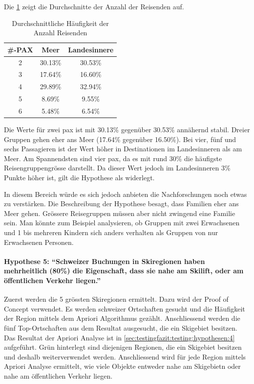 Die \cref{sec:testingfazit:testing:hypothesen:3:2} zeigt die Durchschnitte der Anzahl der Reisenden auf.
\begin{table}[H] 
	\caption{Durchschnittliche Häufigkeit der Anzahl Reisenden}
	\centering
	\label{sec:testingfazit:testing:hypothesen:3:2}
	\begin{tabular}{ | c | c | c | } 
		\hline 
		\rowcolor{tableheadcolor}
		\bfseries \#-PAX & \bfseries Meer & \bfseries Landesinnere \\ \hline 		
		2 & 30.13\% & 30.53\% \\ \hline
		3 & 17.64\% & 16.60\% \\ \hline
		4 & 29.89\% & 32.94\% \\ \hline
		5 & 8.69\% & 9.55\% \\ \hline
		6 & 5.48\% & 6.54\% \\ \hline
	\end{tabular}
\end{table}

Die Werte für zwei \gls{pax} ist mit 30.13\% gegenüber 30.53\% annähernd stabil. Dreier Gruppen gehen eher ans Meer (17.64\% gegenüber 16.50\%). Bei vier, fünf und sechs Passagieren ist der Wert höher in Destinationen im Landesinneren als am Meer. Am Spannendsten sind vier \gls{pax}, da es mit rund 30\% die häufigste Reisengruppengrösse darstellt. Da dieser Wert jedoch im Landesinneren 3\% Punkte höher ist, gilt die Hypothese als widerlegt.

In diesem Bereich würde es sich jedoch anbieten die Nachforschungen noch etwas zu verstärken. Die Beschreibung der Hypothese besagt, dass Familien eher ans Meer gehen. Grössere Reisegruppen müssen aber nicht zwingend eine Familie sein. Man könnte zum Beispiel analysieren, ob Gruppen mit zwei Erwachsenen und 1 bis mehreren Kindern sich anders verhalten als Gruppen von nur Erwachsenen Personen.

\paragraph{Hypothese 5: "`Schweizer Buchungen in Skiregionen haben mehrheitlich (80\%) die Eigenschaft, dass sie nahe am Skilift, oder am öffentlichen Verkehr liegen."'} Zuerst werden die 5 grössten Skiregionen ermittelt. Dazu wird der Proof of Concept verwendet. Es werden schweizer Ortschaften gesucht und die Häufigkeit der Region mittels dem Apriori Algorithmus gezählt. Anschliessend werden die fünf Top-Ortschaften aus dem Resultat ausgesucht, die ein Skigebiet besitzen. Das Resultat der Apriori Analyse ist in \cref{sec:testingfazit:testing:hypothesen:4} aufgeführt. \colorbox{green!25}{Grün} hinterlegt sind diejenigen Regionen, die ein Skigebiet besitzen und deshalb weiterverwendet werden. Anschliessend wird für jede Region mittels Apriori Analyse ermittelt, wie viele Objekte entweder nahe am Skigebietn oder nahe am öffentlichen Verkehr liegen. 


